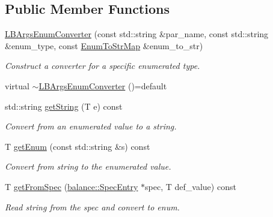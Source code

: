 \subsection*{Public Member Functions}
\begin{DoxyCompactItemize}
\item 
\hyperlink{structvt_1_1vrt_1_1collection_1_1balance_1_1_l_b_args_enum_converter_a38fffccf8165fc8b91f88acd69c85194}{L\+B\+Args\+Enum\+Converter} (const std\+::string \&par\+\_\+name, const std\+::string \&enum\+\_\+type, const \hyperlink{structvt_1_1vrt_1_1collection_1_1balance_1_1_l_b_args_enum_converter_ab4e2b0c525c1ea76f18f2ff45733f3c4}{Enum\+To\+Str\+Map} \&enum\+\_\+to\+\_\+str)
\begin{DoxyCompactList}\small\item\em Construct a converter for a specific enumerated type. \end{DoxyCompactList}\item 
virtual \hyperlink{structvt_1_1vrt_1_1collection_1_1balance_1_1_l_b_args_enum_converter_aa971f742159d754565c8239f4746a459}{$\sim$\+L\+B\+Args\+Enum\+Converter} ()=default
\item 
std\+::string \hyperlink{structvt_1_1vrt_1_1collection_1_1balance_1_1_l_b_args_enum_converter_a6080061d0da724543e9f039316176a0a}{get\+String} (T e) const
\begin{DoxyCompactList}\small\item\em Convert from an enumerated value to a string. \end{DoxyCompactList}\item 
T \hyperlink{structvt_1_1vrt_1_1collection_1_1balance_1_1_l_b_args_enum_converter_aea2a93bc866e73a7d39d4b858d0738d3}{get\+Enum} (const std\+::string \&s) const
\begin{DoxyCompactList}\small\item\em Convert from string to the enumerated value. \end{DoxyCompactList}\item 
T \hyperlink{structvt_1_1vrt_1_1collection_1_1balance_1_1_l_b_args_enum_converter_ae19c95ddd139455d57513d310b0e7b0e}{get\+From\+Spec} (\hyperlink{structvt_1_1vrt_1_1collection_1_1balance_1_1_spec_entry}{balance\+::\+Spec\+Entry} $\ast$spec, T def\+\_\+value) const
\begin{DoxyCompactList}\small\item\em Read string from the spec and convert to enum. \end{DoxyCompactList}\end{DoxyCompactItemize}
